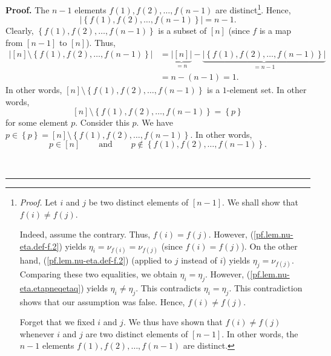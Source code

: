 \documentclass
[numbers=enddot,12pt,final,onecolumn,notitlepage,english]{scrartcl}%
\theoremstyle{definition}
\newenvironment{proof}[1][Proof]{\noindent\textbf{#1.} }{\ \rule{0.5em}{0.5em}}
\newenvironment{verlong}{}{}
\begin{document}
\begin{verlong}
\begin{proof}
The $n-1$ elements $f\left(  1\right)  ,f\left(  2\right)  ,\ldots,f\left(
n-1\right)  $ are distinct\footnote{\textit{Proof.} Let $i$ and $j$ be two
distinct elements of $\left[  n-1\right]  $. We shall show that $f\left(
i\right)  \neq f\left(  j\right)  $.
\par
Indeed, assume the contrary. Thus, $f\left(  i\right)  =f\left(  j\right)  $.
However, (\ref{pf.lem.nu-eta.def-f.2}) yields $\eta_{i}=\nu_{f\left(
i\right)  }=\nu_{f\left(  j\right)  }$ (since $f\left(  i\right)  =f\left(
j\right)  $). On the other hand, (\ref{pf.lem.nu-eta.def-f.2}) (applied to $j$
instead of $i$) yields $\eta_{j}=\nu_{f\left(  j\right)  }$. Comparing these
two equalities, we obtain $\eta_{i}=\eta_{j}$. However,
(\ref{pf.lem.nu-eta.etapneqetaq}) yields $\eta_{i}\neq\eta_{j}$. This
contradicts $\eta_{i}=\eta_{j}$. This contradiction shows that our assumption
was false. Hence, $f\left(  i\right)  \neq f\left(  j\right)  $.
\par
Forget that we fixed $i$ and $j$. We thus have shown that $f\left(  i\right)
\neq f\left(  j\right)  $ whenever $i$ and $j$ are two distinct elements of
$\left[  n-1\right]  $. In other words, the $n-1$ elements $f\left(  1\right)
,f\left(  2\right)  ,\ldots,f\left(  n-1\right)  $ are distinct.}. Hence,
\[
\left\vert \left\{  f\left(  1\right)  ,f\left(  2\right)  ,\ldots,f\left(
n-1\right)  \right\}  \right\vert =n-1.
\]
Clearly, $\left\{  f\left(  1\right)  ,f\left(  2\right)  ,\ldots,f\left(
n-1\right)  \right\}  $ is a subset of $\left[  n\right]  $ (since $f$ is a
map from $\left[  n-1\right]  $ to $\left[  n\right]  $). Thus,%
\begin{align*}
\left\vert \left[  n\right]  \setminus\left\{  f\left(  1\right)  ,f\left(
2\right)  ,\ldots,f\left(  n-1\right)  \right\}  \right\vert  &
=\underbrace{\left\vert \left[  n\right]  \right\vert }_{=n}%
-\underbrace{\left\vert \left\{  f\left(  1\right)  ,f\left(  2\right)
,\ldots,f\left(  n-1\right)  \right\}  \right\vert }_{=n-1}\\
&  =n-\left(  n-1\right)  =1.
\end{align*}
In other words, $\left[  n\right]  \setminus\left\{  f\left(  1\right)
,f\left(  2\right)  ,\ldots,f\left(  n-1\right)  \right\}  $ is a $1$-element
set. In other words,
\[
\left[  n\right]  \setminus\left\{  f\left(  1\right)  ,f\left(  2\right)
,\ldots,f\left(  n-1\right)  \right\}  =\left\{  p\right\}
\]
for some element $p$. Consider this $p$. We have $p\in\left\{  p\right\}
=\left[  n\right]  \setminus\left\{  f\left(  1\right)  ,f\left(  2\right)
,\ldots,f\left(  n-1\right)  \right\}  $. In other words,
\[
p\in\left[  n\right]  \ \ \ \ \ \ \ \ \ \ \text{and}%
\ \ \ \ \ \ \ \ \ \ p\notin\left\{  f\left(  1\right)  ,f\left(  2\right)
,\ldots,f\left(  n-1\right)  \right\}  .
\]



\end{proof}
\end{verlong}
\end{document}
